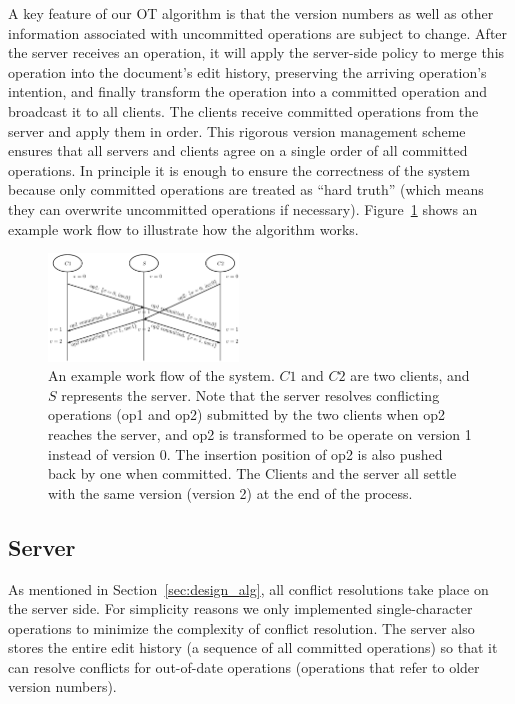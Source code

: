 A key feature of our OT algorithm is that the version numbers as well as other
information associated with uncommitted operations are subject to change. After
the server receives an operation, it will apply the server-side policy to merge
this operation into the document's edit history, preserving the arriving
operation's intention, and finally transform the operation into a committed
operation and broadcast it to all clients. The clients receive committed
operations from the server and apply them in order. This rigorous version
management scheme ensures that all servers and clients agree on a single order
of all committed operations. In principle it is enough to ensure the correctness
of the system because only committed operations are treated as ``hard truth''
(which means they can overwrite uncommitted operations if necessary).
Figure~\ref{fig:walkthrough} shows an example work flow to illustrate how the
algorithm works.

\begin{figure}[t!]
  \centering
  \includegraphics[width=0.45\textwidth]{walkthrough.pdf}

  \caption{An example work flow of the system. $C1$ and $C2$ are two clients,
  and $S$ represents the server. Note that the server resolves conflicting
  operations (op1 and op2) submitted by the two clients when op2 reaches the
  server, and op2 is transformed to be operate on version 1 instead of version
  0. The insertion position of op2 is also pushed back by one when committed.
  The Clients and the server all settle with the same version (version 2) at the
  end of the process.}
  
  \label{fig:walkthrough}
\end{figure}

\subsection{Server}
\label{sec:design_server}

As mentioned in Section~\ref{sec:design_alg}, all conflict resolutions take
place on the server side. For simplicity reasons we only implemented
single-character operations to minimize the complexity of conflict resolution.
The server also stores the entire edit history (a sequence of all committed
operations) so that it can resolve conflicts for out-of-date operations
(operations that refer to older version numbers).

